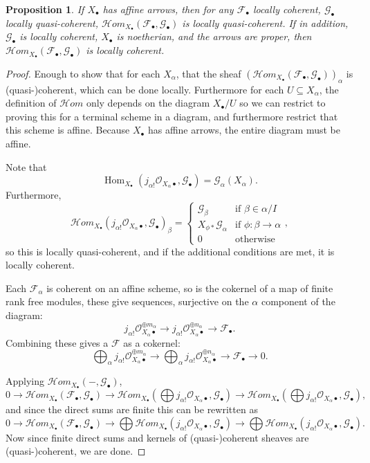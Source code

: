 \documentclass[proquest]{uwthesis}[2014/11/13]
\newtheorem{prop}[theorem]{Proposition}
\theoremstyle{definition}
\DeclareMathOperator{\Hom}{Hom}
\newcommand{\cHom}{\mathcal{H} \textit{om}}
\newcommand{\FF}{\mathscr{F}}
\newcommand{\GG}{\mathscr{G}}
\newcommand{\OO}{\mathcal{O}}
\begin{document}
\begin{prop}
	\label{prp:homqcaffine}
	If $X_\bullet$ has affine arrows, then for any $\FF_\bullet$ locally coherent, $\GG_\bullet$ locally quasi-coherent, $\cHom_{X_\bullet}(\FF_\bullet, \GG_\bullet)$ is locally quasi-coherent.
	If in addition, $\GG_\bullet$ is locally coherent, $X_\bullet$ is noetherian, and the arrows are proper, then $\cHom_{X_\bullet}(\FF_\bullet, \GG_\bullet)$ is locally coherent.
\end{prop}
\begin{proof}
	Enough to show that for each $X_\alpha$, that the sheaf $(\cHom_{X_\bullet}(\FF_\bullet, \GG_\bullet))_\alpha$ is (quasi-)coherent, which can be done locally. Furthermore for each $U \subseteq X_\alpha$, the definition of $\cHom$ only depends on the diagram $X_\bullet / U$ so we can restrict to proving this for a terminal scheme in a diagram, and furthermore restrict that this scheme is affine.
	Because $X_\bullet$ has affine arrows, the entire diagram must be affine.
		
	Note that
	\[
		\Hom_{X_\bullet}(j_{\alpha !} \OO_{X_\alpha \bullet}, \GG_\bullet) = \GG_\alpha(X_\alpha).
	\]
	Furthermore,
	\[
		\cHom_{X_\bullet}(j_{\alpha !} \OO_{X_\alpha \bullet}, \GG_\bullet)_\beta = \begin{cases}
													\GG_\beta  & \text{if } \beta \in \alpha / I \\
													X_{\phi *} \GG_\alpha & \text{if } \phi : \beta \rightarrow \alpha \\
													0 & \text{otherwise}
													\end{cases},
	\]
	so this is locally quasi-coherent, and if the additional conditions are met, it is locally coherent.
	
	Each $\FF_\alpha$ is coherent on an affine scheme, so is the cokernel of a map of finite rank free modules, these give sequences, surjective on the $\alpha$ component of the diagram:
	\[
		j_{\alpha !}\OO_{X_\alpha \bullet}^{\oplus m_\alpha} \rightarrow j_{\alpha !}\OO_{X_\alpha \bullet}^{\oplus n_\alpha} \rightarrow \FF_\bullet.
	\]
	Combining these gives a $\FF$ as a cokernel:
	\[
		\bigoplus_\alpha j_{\alpha !}\OO_{X_\alpha \bullet}^{\oplus m_\alpha} \rightarrow \bigoplus_\alpha j_{\alpha !}\OO_{X_\alpha \bullet}^{ \oplus n_\alpha} \rightarrow \FF_\bullet \rightarrow 0.
	\]
	
	Applying $\cHom_{X_\bullet}(-,\GG_\bullet)$,
	\[
		0 \rightarrow \cHom_{X_\bullet}(\FF_\bullet, \GG_\bullet) \rightarrow \cHom_{X_\bullet}(\bigoplus j_{\alpha !}\OO_{X_\alpha \bullet}, \GG_\bullet) \rightarrow \cHom_{X_\bullet}(\bigoplus j_{\alpha !}\OO_{X_\alpha \bullet}, \GG_\bullet),
	\]
	and since the direct sums are finite this can be rewritten as
	\[
		0 \rightarrow \cHom_{X_\bullet}(\FF_\bullet, \GG_\bullet) \rightarrow \bigoplus \cHom_{X_\bullet}(j_{\alpha !}\OO_{X_\alpha \bullet}, \GG_\bullet) \rightarrow \bigoplus \cHom_{X_\bullet}(j_{\alpha !}\OO_{X_\alpha \bullet}, \GG_\bullet).
	\]
	Now since finite direct sums and kernels of (quasi-)coherent sheaves are (quasi-)coherent, we are done.
\end{proof}
\end{document}
